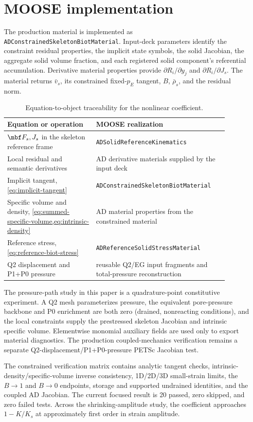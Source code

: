 \section{MOOSE implementation}

The production material is implemented as
\texttt{ADConstrainedSkeletonBiotMaterial}.  Input-deck parameters identify the
constraint residual properties, the implicit state symbols, the solid Jacobian,
the aggregate solid volume fraction, and each registered solid component's
referential accumulation.  Derivative material properties provide
\(\partial R_i/\partial y_j\) and \(\partial R_i/\partial J_s\).  The material
returns \(\bar v_s\), its constrained fixed-\(p_E\) tangent, \(B\),
\(\bar\rho_s\), and the residual norm.

\begin{table}[ht]
 \centering
 \caption{Equation-to-object traceability for the nonlinear coefficient.}
 \label{tab:traceability}
 \begin{tabular}{p{0.37\linewidth}p{0.53\linewidth}}
  \toprule
  Equation or operation & MOOSE realization \\
  \midrule
  \(\mbf F_s,J_s\) in the skeleton reference frame &
  \texttt{ADSolidReferenceKinematics} \\
  Local residual and semantic derivatives &
  AD derivative materials supplied by the input deck \\
  Implicit tangent, \cref{eq:implicit-tangent} &
  \texttt{ADConstrainedSkeletonBiotMaterial} \\
  Specific volume and density, \cref{eq:summed-specific-volume,eq:intrinsic-density} &
  AD material properties from the constrained material \\
  Reference stress, \cref{eq:reference-biot-stress} &
  \texttt{ADReferenceSolidStressMaterial} \\
  Q2 displacement and P1+P0 pressure &
  reusable Q2/EG input fragments and total-pressure reconstruction \\
  \bottomrule
 \end{tabular}
\end{table}

The pressure-path study in this paper is a quadrature-point constitutive
experiment.  A Q2 mesh parameterizes pressure, the equivalent pore-pressure
backbone and P0 enrichment are both zero (drained, nonreacting conditions), and
the local constraints supply the prestressed skeleton Jacobian and intrinsic
specific volume.  Elementwise monomial auxiliary fields are used only to export
material diagnostics.  The production coupled-mechanics verification remains a
separate Q2-displacement/P1+P0-pressure PETSc Jacobian test.

The constrained verification matrix contains analytic tangent checks,
intrinsic-density/specific-volume inverse consistency, 1D/2D/3D small-strain
limits, the \(B\to1\) and \(B\to0\) endpoints, storage and supported undrained
identities, and the coupled AD Jacobian.  The current focused result is 20
passed, zero skipped, and zero failed tests.  Across the shrinking-amplitude
study, the coefficient approaches \(1-K/K_s\) at approximately first order in
strain amplitude.

